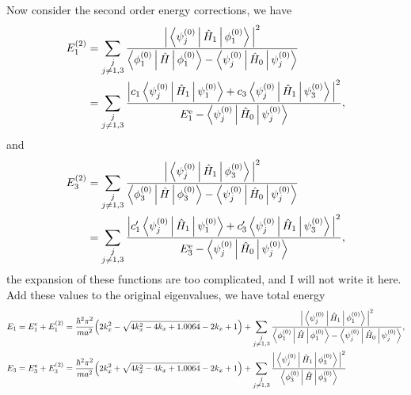 \documentclass[12pt]{article}
\begin{document}
\begin{enumerate}[(a)]
	      Now consider the second order energy corrections,
	      we have
	      \begin{equation}
	      	\begin{split}
	      		E_1^{(2)} &= \sum_{\substack{j\\j\neq 1, 3}} \frac{\Big\lvert \Braket{\psi_j^{(0)} | \hat{H}_1 | \phi_1^{(0)}} \Big\rvert^2}{ \Braket{\phi_1^{(0)} | \hat{H} | \phi_1^{(0)}}
	      			- \Braket{\psi_j^{(0)} | \hat{H}_0 | \psi_j^{(0)}}} \\
	      		&=  \sum_{\substack{j\\j\neq 1, 3}} \frac{\Big\lvert c_1 \Braket{\psi_j^{(0)} | \hat{H}_1 | \psi_1^{(0)}} + c_3 \Braket{\psi_j^{(0)} | \hat{H}_1 | \psi_3^{(0)}} \Big\rvert^2}{ E_1^{\text{e}}
	      			- \Braket{\psi_j^{(0)} | \hat{H}_0 | \psi_j^{(0)}}},
	      	\end{split}
	      \end{equation}
	      and
	      \begin{equation}
	      	\begin{split}
	      		E_3^{(2)} &= \sum_{\substack{j\\j\neq 1, 3}} \frac{\Big\lvert \Braket{\psi_j^{(0)} | \hat{H}_1 | \phi_3^{(0)}} \Big\rvert^2}{ \Braket{\phi_3^{(0)} | \hat{H} | \phi_3^{(0)}}
	      			- \Braket{\psi_j^{(0)} | \hat{H}_0 | \psi_j^{(0)}}} \\
	      		&=  \sum_{\substack{j\\j\neq 1, 3}} \frac{\Big\lvert c_1' \Braket{\psi_j^{(0)} | \hat{H}_1 | \psi_1^{(0)}} + c_3' \Braket{\psi_j^{(0)} | \hat{H}_1 | \psi_3^{(0)}} \Big\rvert^2}{ E_3^{\text{e}}
	      			- \Braket{\psi_j^{(0)} | \hat{H}_0 | \psi_j^{(0)}}},
	      	\end{split}
	      \end{equation}
	      the expansion of these functions are too complicated, and I will not write it here.
	      Add these values to the original eigenvalues, we have total energy
	      \begin{align}
	      	E_1 = E_{1}^{\text{e}} + E_1^{(2)} & = \frac{\hbar^2\pi^2}{ma^2} \Big(2 k_x^2-\sqrt{4 k_x^2-4 k_x+1.0064}-2 k_x+1\Big) + \sum_{\substack{j  \\j\neq 1, 3}} \frac{\Big\lvert \Braket{\psi_j^{(0)} | \hat{H}_1 | \phi_1^{(0)}} \Big\rvert^2}{ \Braket{\phi_1^{(0)} | \hat{H} | \phi_1^{(0)}}
	      	- \Braket{\psi_j^{(0)} | \hat{H}_0 | \psi_j^{(0)}}}, \\
	      	E_3 = E_{3}^{\text{e}} + E_3^{(2)} & =  \frac{\hbar^2\pi^2}{ma^2} \Big(2 k_x^2+\sqrt{4 k_x^2-4 k_x+1.0064}-2 k_x+1\Big) + \sum_{\substack{j \\j\neq 1, 3}} \frac{\Big\lvert \Braket{\psi_j^{(0)} | \hat{H}_1 | \phi_3^{(0)}} \Big\rvert^2}{ \Braket{\phi_3^{(0)} | \hat{H} | \phi_3^{(0)}}
}
\end{align}
\end{enumerate}
\end{document}
